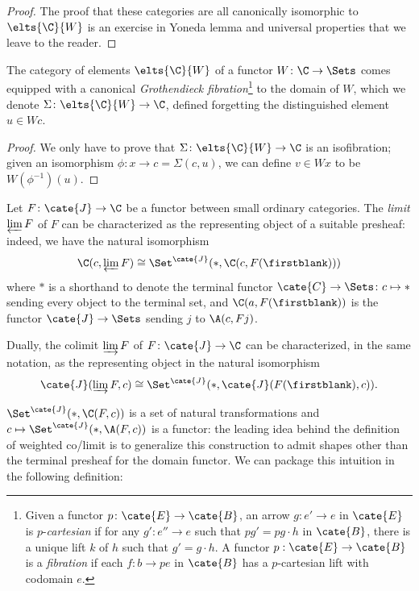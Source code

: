 \begin{proof}
The proof that these categories are all canonically isomorphic to $\elts{\C}{W}$ is an exercise in Yoneda lemma and universal properties that we leave to the reader.
\end{proof}
\begin{proposition}\label{fibelem}
The category of elements $\elts{\C}{W}$ of a functor $W\colon \C\to \Sets$ comes equipped with a canonical \emph{Grothendieck fibration}\footnote{Given a functor $p \colon \cate{E} \to \cate{B}$, an arrow $g \colon e' \to e$ in $\cate{E}$ is $p$-\emph{cartesian} if for any $g'\colon e'' \to e$ such that $pg' = pg \cdot h$ in $\cate{B}$, there is a unique lift $k$ of $h$ such that $g' = g \cdot h$. A functor $p :\cate{E} \to \cate{B}$ is a \emph{fibration} if each $f: b \to pe$ in $\cate{B}$ has a $p$-cartesian lift with codomain $e$.} to the domain of $W$, which we denote $\Sigma\colon \elts{\C}{W}\to \C$, defined forgetting the distinguished element $u\in Wc$. 
\end{proposition}
\begin{proof}
We only have to prove that $\Sigma \colon \elts{\C}{W}\to \C$ is an isofibration; given an isomorphism $\phi\colon x\to c=\Sigma(c,u)$, we can define $v\in Wx$ to be $W(\phi^{-1})(u)$.
\end{proof}
\begin{remark}
Let $F\colon \cate{J}\to\C$ be a functor between small ordinary categories. The \emph{limit} $\varprojlim F$ of $F$ can be characterized as the representing object of a suitable presheaf: indeed, we have the natural isomorphism
\[
\C(c, \varprojlim F)\cong \Set^\cate{J}(*, \C(c,F(\firstblank)))
\]
where $*$ is a shorthand to denote the terminal functor $\cate{C}\to \Sets \colon c\mapsto *$ sending every object to the terminal set, and $\C(a,F(\firstblank))$ is the functor $\cate{J}\to \Sets$ sending $j$ to $\A(c, Fj)$.

Dually, the colimit $\varinjlim F$ of $F\colon \cate{J}\to \C$ can be characterized, in the same notation, as the representing object in the natural isomorphism
\[
\cate{J}(\varinjlim F,c)\cong \Set^\cate{J}(*, \cate{J}(F(\firstblank),c)).
\]
\end{remark}
$\Set^\cate{J}(*, \C(F,c))$ is a set of natural transformations and $c\mapsto \Set^\cate{J}(*, \A(F,c))$ is a functor: the leading idea behind the definition of weighted co/limit is to generalize this construction to admit shapes other than the terminal presheaf for the domain functor.  We can package this intuition in the following definition:
